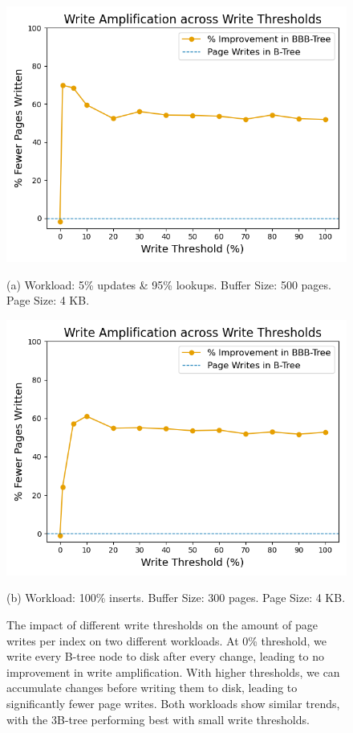 \begin{figure}[ht]
  \centering
  \begin{minipage}{0.48\textwidth}
    \centering
    \includegraphics[width=\textwidth]{figures/evaluation/pageviews_write_thresholds_improvement.png}
    \caption*{(a) Workload: 5\% updates \& 95\% lookups. Buffer Size: 500 pages. Page Size: 4 KB.}
  \end{minipage}\hfill
  \begin{minipage}{0.48\textwidth}
    \centering
  \includegraphics[width=\textwidth]{figures/evaluation/pageviews_write_thresholds_improvement_inserts.png}
    \caption*{(b) Workload: 100\% inserts. Buffer Size: 300 pages. Page Size: 4 KB.}
  \end{minipage}
  \caption{The impact of different write thresholds on the amount of page writes per index on two different workloads. At 0\% threshold, we write every B-tree node to disk after every change, leading to no improvement in write amplification. With higher thresholds, we can accumulate changes before writing them to disk, leading to significantly fewer page writes. Both workloads show similar trends, with the 3B-tree performing best with small write thresholds.}
  \label{fig:write_thresholds_improvement}
\end{figure}

